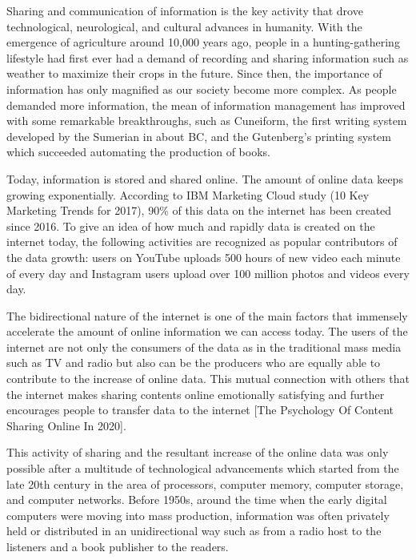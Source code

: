

Sharing and communication of information is the key activity that drove technological, neurological, and cultural advances in humanity. With the emergence of agriculture around 10,000 years ago, people in a hunting-gathering lifestyle had first ever had a demand of recording and sharing information such as weather to maximize their crops in the future. Since then, the importance of information has only magnified as our society become more complex. As people demanded more information, the mean of information management has improved with some remarkable breakthroughs, such as Cuneiform, the first writing system developed by the Sumerian in about BC, and the Gutenberg's printing system which succeeded automating the production of books. 

Today, information is stored and shared online. The amount  of online data keeps growing exponentially. According to IBM Marketing Cloud study (10 Key Marketing Trends for 2017), 90\% of this data on the internet has been created since 2016. To give an idea of how much and rapidly data is created on the internet today, the following activities are recognized as popular contributors of the data growth: users on YouTube uploads 500 hours of new video each minute of every day and Instagram users upload over 100 million photos and videos every day.

The bidirectional nature of the internet is one of the main factors that immensely accelerate the amount of online information we can access today. The users of the internet are not only the consumers of the data as in the traditional mass media such as TV and radio but also can be the producers who are equally able to contribute to the increase of online data. This mutual connection with others that the internet makes sharing contents online emotionally satisfying and further encourages people to transfer data to the internet [The Psychology Of Content Sharing Online In 2020].

This activity of sharing and the resultant increase of the online data was only possible after a multitude of technological advancements which started from the late 20th century in the area of processors, computer memory, computer storage, and computer networks. Before 1950s, around the time when the early digital computers were moving into mass production, information was often privately held or distributed in an unidirectional way such as from a radio host to the listeners and a book publisher to the readers.

